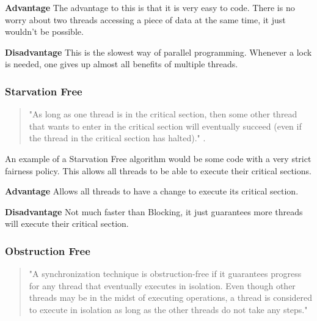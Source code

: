 \documentclass[letterpaper, 12pt]{article}
\begin{document}
\par\vspace{\baselineskip}

{\bfseries Advantage}\newline
The advantage to this is that it is very easy to code. There is no worry about two threads 
accessing a piece of data at the same time, it just wouldn't be possible.
\par\vspace{\baselineskip}

{\bfseries Disadvantage}\newline
This is the slowest way of parallel programming. Whenever a lock is needed, one gives up 
almost all benefits of multiple threads.

\newpage
\subsubsection{Starvation Free}

\begin{quotation}
"As long as one thread is in the critical section, then some other thread that wants 
to enter in the critical section will eventually succeed (even if the thread in the 
critical section has halted)." \citep{artofmulti}.
\end{quotation}

An example of a Starvation Free algorithm would be some code with a very strict fairness 
policy. This allows all threads to be able to execute their critical sections.

{\bfseries Advantage}\newline
Allows all threads to have a change to execute its critical section.
\par\vspace{\baselineskip}

{\bfseries Disadvantage}\newline
Not much faster than Blocking, it just guarantees more threads will execute their critical section.

\subsubsection{Obstruction Free}

\begin{quotation}
"A synchronization technique is obstruction-free if it  guarantees progress for any 
thread that  eventually executes  in  isolation. Even  though other  threads  may  be  
in the  midst  of  executing operations,  a  thread  is  considered to execute in 
isolation as long as the other threads do not take any steps." \citep{obsfree}
\end{quotation}
\end{document}
